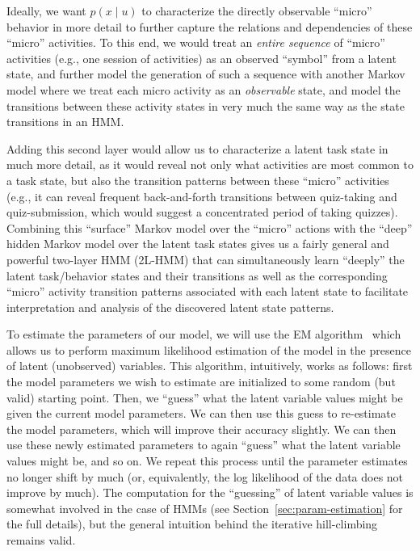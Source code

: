 Ideally, we want $p(x \mid u)$ to characterize the directly observable
``micro'' behavior in more detail to further capture the relations and
dependencies of these ``micro'' activities. To this end, we would treat an
\emph{entire sequence} of ``micro'' activities (e.g., one session of
activities) as an observed ``symbol'' from a latent state, and further
model the generation of such a sequence with another Markov model where we
treat each micro activity as an \emph{observable} state, and model the
transitions between these activity states in very much the same way as the
state transitions in an HMM.

Adding this second layer would allow us to characterize a latent task
state in much more detail, as it would reveal not only what activities are
most common to a task state, but also the transition patterns between these
``micro'' activities (e.g., it can reveal frequent back-and-forth
transitions between quiz-taking and quiz-submission, which would suggest a
concentrated period of taking quizzes). Combining this ``surface'' Markov
model over the ``micro'' actions with the ``deep'' hidden Markov model over
the latent task states gives us a fairly general and powerful two-layer HMM
(2L-HMM) that can simultaneously learn ``deeply'' the latent task/behavior
states and their transitions as well as the corresponding ``micro''
activity transition patterns associated with each latent state to
facilitate interpretation and analysis of the discovered latent state
patterns.

To estimate the parameters of our model, we will use the EM
algorithm~\citep{Dempster:1977:JRSS} which allows us to perform maximum
likelihood estimation of the model in the presence of latent (unobserved)
variables. This algorithm, intuitively, works as follows: first the model
parameters we wish to estimate are initialized to some random (but valid)
starting point. Then, we ``guess'' what the latent variable values might
be given the current model parameters. We can then use this guess to
re-estimate the model parameters, which will improve their accuracy
slightly. We can then use these newly estimated parameters to again
``guess'' what the latent variable values might be, and so on. We repeat
this process until the parameter estimates no longer shift by much (or,
equivalently, the log likelihood of the data does not improve by much). The
computation for the ``guessing'' of latent variable values is somewhat
involved in the case of HMMs (see Section~\ref{sec:param-estimation} for
the full details), but the general intuition behind the iterative
hill-climbing remains valid.

